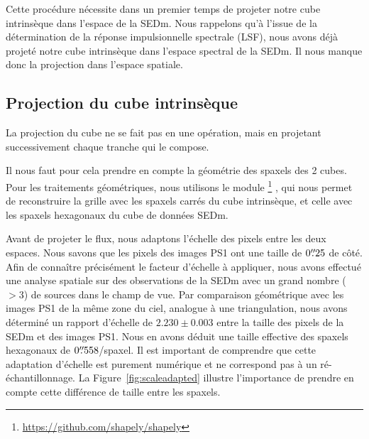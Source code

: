 \documentclass[../main/main.tex]{subfiles}
\begin{document}
Cette procédure nécessite dans un premier temps de projeter notre cube
intrinsèque dans l'espace de la SEDm. Nous rappelons qu'à l'issue de la
détermination de la réponse impulsionnelle spectrale (LSF), nous avons
déjà projeté notre cube intrinsèque dans l'espace spectral de la
SEDm. Il nous manque donc la projection dans l'espace spatiale.

\subsection{Projection du cube intrinsèque}

La projection du cube ne se fait pas en une opération, mais en projetant
successivement chaque tranche qui le compose.

Il nous faut pour cela prendre en compte la géométrie des spaxels des 2
cubes. Pour les traitements géométriques, nous utilisons le module
\footnote{\url{https://github.com/shapely/shapely}} \citep{shapely2007}, qui
nous permet de reconstruire la grille avec les spaxels carrés du cube
intrinsèque, et celle avec les spaxels hexagonaux du cube de données
SEDm.

Avant de projeter le flux, nous adaptons l'échelle des pixels entre les
deux espaces. Nous savons que les pixels des images PS1 ont une taille
de $0\overset{\prime\prime}{.}25$ de côté. Afin de connaître précisément le facteur
d'échelle à appliquer, nous avons effectué une analyse spatiale sur des
observations de la SEDm avec un grand nombre ($>3$) de sources dans le
champ de vue. Par comparaison géométrique avec les images PS1 de la même
zone du ciel, analogue à une triangulation, nous avons déterminé un
rapport d'échelle de $2.230\pm0.003$ entre la taille des pixels de la
SEDm et des images PS1. Nous en avons déduit une taille effective des
spaxels hexagonaux de $0\overset{\prime\prime}{.}558$/spaxel. Il est important de
comprendre que cette adaptation d'échelle est purement numérique et ne correspond pas à
un ré-échantillonnage. La Figure~\ref{fig:scaleadapted} illustre
l'importance de prendre en compte cette différence de taille entre les spaxels.
\end{document}
